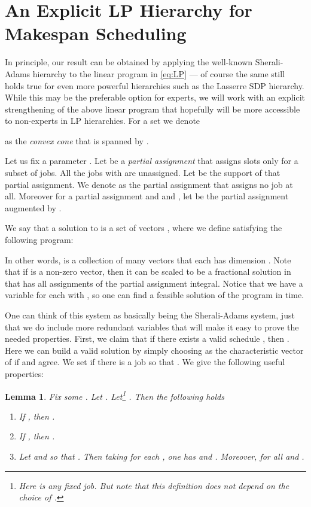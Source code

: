 \documentclass[11pt,letterpaper,oneside,english]{article}
\theoremstyle{theorem}
\newtheorem{lemma}[theorem]{Lemma}
\begin{document}
\section{An Explicit LP Hierarchy for Makespan Scheduling}

In principle, our result can be obtained by applying the well-known Sherali-Adams
hierarchy to the linear program in \eqref{eq:LP} --- of course the same still
holds true for even more powerful hierarchies such as the Lasserre SDP hierarchy. 
While this may be the preferable option for experts, we will work with 
an explicit strengthening of the above linear program that hopefully will be more
accessible to non-experts in LP hierarchies. For a set  we denote
 
as the \emph{convex cone} that is spanned by .

Let us fix a
parameter .
Let  be a \emph{partial assignment} that
assigns slots
only for a subset of jobs. All the jobs with  are unassigned.
Let  be the support of that partial
assignment. We denote  as the partial assignment that assigns
no job at all.
Moreover for a partial assignment  and  and ,
let  be the partial assignment augmented by
.


We say that a solution to  is a set of vectors 
,
where we define 
satisfying the following program:

In other words,  is a collection of  many vectors 
that each has dimension .
Note that if  is a non-zero vector, then it can be scaled to be a 
fractional solution in  that has all assignments of the partial assignment 
integral. 
Notice that we have a variable for each  with , 
so one can find a feasible solution of the program in  time. 

One can think of this system as basically being the Sherali-Adams system, just that 
we do include more redundant variables that will make it easy to prove the needed
properties. 
First, we claim that if there exists a valid schedule , then
. Here we can build a valid solution
by simply choosing  as the
characteristic vector of 
if  and  agree. We set  if there
is a job  so that .
We give the following useful properties:

\begin{lemma}\label{lem:HierarchyProperties}
Fix some . Let . Let\footnote{Here  is any fixed job. But note that this definition does not depend on
the choice of .} . Then the following holds
\begin{enumerate}
\item[a)]  If , then
.
\item[b)] If , then 
.
\item[c)] Let  and  so that .
Then taking  for each , one
has  and .
Moreover,   for all  and .
\end{enumerate}
\end{lemma}
\end{document}

